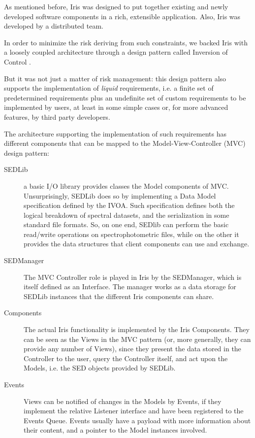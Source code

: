 \documentclass[final,5p]{elsarticle}
\begin{document}
As mentioned before, Iris was designed to put together existing and newly developed software components in a rich, extensible application. Also, Iris was developed by a distributed team.

In order to minimize the risk deriving from such constraints, we backed Iris with a loosely coupled architecture through a design pattern called Inversion of Control \citep*{ioc}.

But it was not just a matter of risk management: this design pattern also supports the implementation of \emph{liquid} requirements, i.e. a finite set of predetermined requirements plus an undefinite set of custom requirements to be implemented by users, at least in some simple cases or, for more advanced features, by third party developers.

The architecture supporting the implementation of such requirements has different components that can be mapped to the Model-View-Controller (MVC) design pattern:
\begin{description}
\item[SEDLib] a basic I/O library provides classes the Model components of MVC. Unsurprisingly, SEDLib does so by implementing a Data Model specification defined by the IVOA. Such specification defines both the logical breakdown of spectral datasets, and the serialization in some standard file formats. So, on one end, SEDlib can perform the basic read/write operations on spectrophotometric files, while on the other it provides the data structures that client components can use and exchange.
\item[SEDManager] The MVC Controller role is played in Iris by the SEDManager, which is itself defined as an Interface. The manager works as a data storage for SEDLib instances that the different Iris components can share.
\item[Components] The actual Iris functionality is implemented by the Iris Components. They can be seen as the Views in the MVC pattern (or, more generally, they can provide any number of Views), since they present the data stored in the Controller to the user, query the Controller itself, and act upon the Models, i.e. the SED objects provided by SEDLib.
\item[Events] Views can be notified of changes in the Models by Events, if they implement the relative Listener interface and have been registered to the Events Queue. Events usually have a payload with more information about their content, and a pointer to the Model instances involved.
\end{description}
\end{document}

